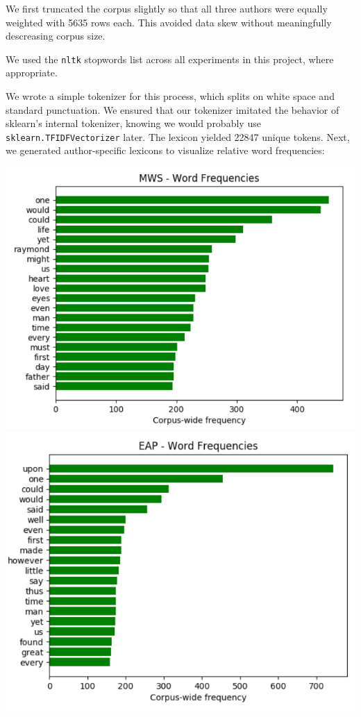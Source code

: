 \documentclass[12pt]{article}
\begin{document}
We first truncated the corpus slightly so that all three authors were equally weighted with 5635 rows each. This avoided data skew without meaningfully descreasing corpus size. 

We used the \texttt{nltk} stopwords list across all experiments in this project, where appropriate.

We wrote a simple tokenizer for this process, which splits on white space and standard punctuation. We ensured that our tokenizer imitated the behavior of sklearn's internal tokenizer, knowing we would probably use \texttt{sklearn.TFIDFVectorizer} later. The lexicon yielded 22847 unique tokens. Next, we generated author-specific lexicons to visualize relative word frequencies:

\includegraphics[scale=.40, center]{images/word_freq_mws.png}
\vskip 0.2in
\includegraphics[scale=.40, center]{images/word_freq_eap.png}
\end{document}
